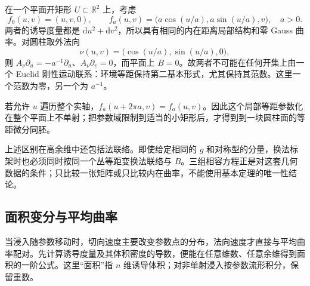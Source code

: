 \begin{example}\label{g3:exm:plane-cylinder-isometry}
	在一个平面开矩形 \(U\subset\mathbb R^2\) 上，考虑
	\[
		f_0(u,v)=(u,v,0),\qquad
		f_a(u,v)=\bigl(a\cos(u/a),a\sin(u/a),v\bigr),\quad a>0.
	\]
	两者的诱导度量都是 \(\mathrm du^2+\mathrm dv^2\)，所以具有相同的内在距离局部结构和零 Gauss 曲率。对圆柱取外法向
	\[
		\nu(u,v)=\bigl(\cos(u/a),\sin(u/a),0\bigr),
	\]
	则 \(A_\nu\partial_u=-a^{-1}\partial_u\)、\(A_\nu\partial_v=0\)，而平面上 \(B=0\)。故两者不可能在任何开集上由一个 Euclid 刚性运动联系：环境等距保持第二基本形式，尤其保持其范数。这里一个范数为零，另一个为 \(a^{-1}\)。

	若允许 \(u\) 遍历整个实轴，\(f_a(u+2\pi a,v)=f_a(u,v)\)。因此这个局部等距参数化在整个平面上不单射；把参数域限制到适当的小矩形后，才得到到一块圆柱面的等距微分同胚。
\end{example}

上述区别在高余维中还包括法联络。即使给定相同的 \(g\) 和对称型的分量，换法标架时也必须同时按同一个丛等距变换法联络与 \(B\)。三组相容方程正是对这套几何数据的条件；只比较一张矩阵或只比较内在曲率，不能使用基本定理的唯一性结论。

\subsection{面积变分与平均曲率}
\label{g3:subsec:0404:04}

当浸入随参数移动时，切向速度主要改变参数点的分布，法向速度才直接与平均曲率配对。先计算诱导度量及其体积密度的导数，便能在任意维数、任意余维得到面积的一阶公式。这里“面积”指 \(n\) 维诱导体积；对非单射浸入按参数流形积分，保留重数。

